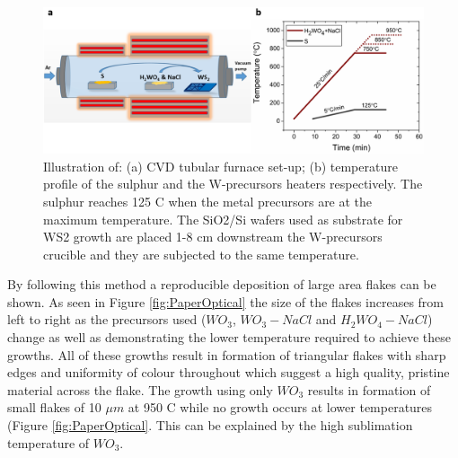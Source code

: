 \begin{figure}[h]
	\begin{center}
		\includegraphics[scale=0.3]{PaperSIFurnace.png}
		\caption{Illustration of: (a) CVD tubular furnace set-up; (b) temperature profile of the sulphur and the W-precursors heaters respectively. The sulphur reaches 125 {\degree}C when the metal precursors are at the maximum temperature. The SiO2/Si wafers used as substrate for WS2 growth are placed 1-8 cm downstream the W-precursors crucible and they are subjected to the same temperature.}
		\label{fig:PaperSIFurnace}
	\end{center}
\end{figure} By following this method a reproducible deposition of large area flakes can be shown. As seen in Figure \ref{fig:PaperOptical} the size of the flakes increases from left to right as the precursors used ($WO_3$, $WO_3-NaCl$ and $H_2WO_4-NaCl$) change as well as demonstrating the lower temperature required to achieve these growths. All of these growths result in formation of triangular flakes with sharp edges and uniformity of colour throughout which suggest a high quality, pristine material across the flake. 
The growth using only $WO_3$ results in formation of small flakes of 10 $\mu m$ at 950 {\degree}C while no growth occurs at lower temperatures (Figure \ref{fig:PaperOptical}. This can be explained by the high sublimation temperature of $WO_3$.

